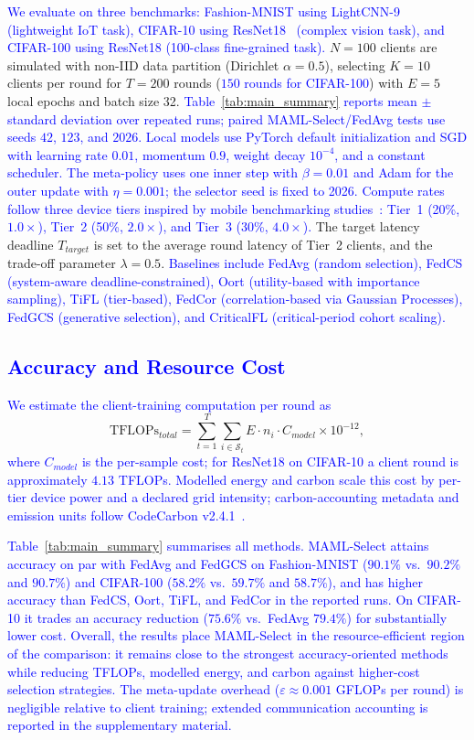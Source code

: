 \documentclass[journal]{IEEEtran}
\newcommand{\revision}[1]{\textcolor{blue}{#1}}
\begin{document}
\revision{We evaluate on three benchmarks: Fashion-MNIST using LightCNN-9~\cite{wu2018light} (lightweight IoT task), CIFAR-10 using ResNet18~\cite{he2016deep} (complex vision task), and CIFAR-100 using ResNet18 (100-class fine-grained task).} $N = 100$ clients are simulated with non-IID data partition (Dirichlet $\alpha = 0.5$), selecting $K = 10$ clients per round for $T = 200$ rounds (\revision{$150$ rounds for CIFAR-100}) with $E = 5$ local epochs and batch size 32. \revision{Table~\ref{tab:main_summary} reports mean $\pm$ standard deviation over repeated runs; paired MAML-Select/FedAvg tests use seeds $42$, $123$, and $2026$.} \revision{Local models use PyTorch default initialization and SGD with learning rate $0.01$, momentum $0.9$, weight decay $10^{-4}$, and a constant scheduler. The meta-policy uses one inner step with $\beta=0.01$ and Adam for the outer update with $\eta=0.001$; the selector seed is fixed to 2026.} \revision{Compute rates follow three device tiers inspired by mobile benchmarking studies~\cite{ignatov2018ai}: Tier~1 (20\%, $1.0\times$), Tier~2 (50\%, $2.0\times$), and Tier~3 (30\%, $4.0\times$).} The target latency deadline $T_{target}$ is set to the average round latency of Tier~2 clients, and the trade-off parameter $\lambda = 0.5$. \revision{Baselines include FedAvg (random selection), FedCS (system-aware deadline-constrained), Oort (utility-based with importance sampling), TiFL (tier-based), FedCor (correlation-based via Gaussian Processes), FedGCS (generative selection), and CriticalFL (critical-period cohort scaling).}

\subsection{\revision{Accuracy and Resource Cost}}
\revision{We estimate the client-training computation per round as}
\begin{equation}
	\text{TFLOPs}_{total} = \sum_{t=1}^{T} \sum_{i \in \mathcal{S}_t} E \cdot n_i \cdot C_{model} \times 10^{-12},
	\label{eq:tflops}
\end{equation}
\revision{where $C_{model}$ is the per-sample cost; for ResNet18 on CIFAR-10 a client round is approximately $4.13$ TFLOPs. Modelled energy and carbon scale this cost by per-tier device power and a declared grid intensity; carbon-accounting metadata and emission units follow CodeCarbon v2.4.1~\cite{courty2024codecarbon}.}

\revision{Table~\ref{tab:main_summary} summarises all methods. MAML-Select attains accuracy on par with FedAvg and FedGCS on Fashion-MNIST ($90.1\%$ vs.\ $90.2\%$ and $90.7\%$) and CIFAR-100 ($58.2\%$ vs.\ $59.7\%$ and $58.7\%$), and has higher accuracy than FedCS, Oort, TiFL, and FedCor in the reported runs. On CIFAR-10 it trades an accuracy reduction ($75.6\%$ vs.\ FedAvg $79.4\%$) for substantially lower cost. Overall, the results place MAML-Select in the resource-efficient region of the comparison: it remains close to the strongest accuracy-oriented methods while reducing TFLOPs, modelled energy, and carbon against higher-cost selection strategies. The meta-update overhead ($\varepsilon \approx 0.001$ GFLOPs per round) is negligible relative to client training; extended communication accounting is reported in the supplementary material.}
\end{document}
